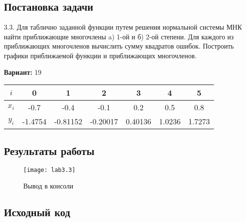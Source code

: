 \subsection{Постановка задачи}
3.3. Для таблично заданной функции путем решения нормальной системы МНК найти приближающие многочлены a) 1-ой  и б) 2-ой степени. Для каждого из приближающих многочленов вычислить сумму квадратов ошибок. Построить графики приближаемой функции и приближающих многочленов.

{\bfseries Вариант:} 19
    \begin{center}
        \begin{tabular}{ |c|c|c|c|c|c|c| } 
			 \hline
			 $i$ & 0 & 1 & 2 & 3 & 4 & 5 \\ 
			 \hline
			 $x_i$ & -0.7 & -0.4 & -0.1 & 0.2 & 0.5 & 0.8 \\ 
			 \hline
			 $y_i$ & -1.4754 & -0.81152 & -0.20017 & 0.40136 & 1.0236 & 1.7273 \\ 
			 \hline
        \end{tabular}
    \end{center}
\pagebreak

\subsection{Результаты работы}
\begin{figure}[h!]
\centering
\texttt{[image: lab3.3]}
\caption{Вывод в консоли}
\end{figure}


\subsection{Исходный код}

\pagebreak

